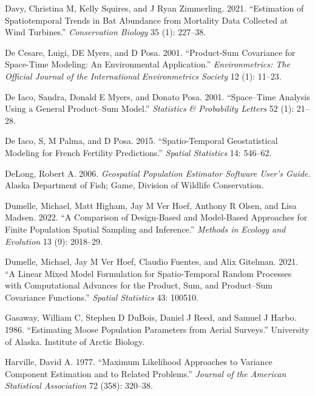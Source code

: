 \documentclass[smallextended]{svjour3}       %
\newlength{\cslhangindent}
\newlength{\cslentryspacingunit} %
\newenvironment{CSLReferences}[2] %
 {%
  \setlength{\parindent}{0pt}
  \ifodd #1
  \let\oldpar\par
  \def\par{\hangindent=\cslhangindent\oldpar}
  \fi
  \setlength{\parskip}{#2\cslentryspacingunit}
 }%
 {}
\begin{document}
\begin{CSLReferences}{1}{0}
\leavevmode{}%
Davy, Christina M, Kelly Squires, and J Ryan Zimmerling. 2021.
{``Estimation of Spatiotemporal Trends in Bat Abundance from Mortality
Data Collected at Wind Turbines.''} \emph{Conservation Biology} 35 (1):
227--38.

\leavevmode{}%
De Cesare, Luigi, DE Myers, and D Posa. 2001. {``Product-Sum Covariance
for Space-Time Modeling: An Environmental Application.''}
\emph{Environmetrics: The Official Journal of the International
Environmetrics Society} 12 (1): 11--23.

\leavevmode{}%
De Iaco, Sandra, Donald E Myers, and Donato Posa. 2001. {``Space--Time
Analysis Using a General Product--Sum Model.''} \emph{Statistics \&
Probability Letters} 52 (1): 21--28.

\leavevmode{}%
De Iaco, S, M Palma, and D Posa. 2015. {``Spatio-Temporal Geostatistical
Modeling for French Fertility Predictions.''} \emph{Spatial Statistics}
14: 546--62.

\leavevmode{}%
DeLong, Robert A. 2006. \emph{Geospatial Population Estimator Software
User's Guide}. Alaska Department of Fish; Game, Division of Wildlife
Conservation.

\leavevmode{}%
Dumelle, Michael, Matt Higham, Jay M Ver Hoef, Anthony R Olsen, and Lisa
Madsen. 2022. {``A Comparison of Design-Based and Model-Based Approaches
for Finite Population Spatial Sampling and Inference.''} \emph{Methods
in Ecology and Evolution} 13 (9): 2018--29.

\leavevmode{}%
Dumelle, Michael, Jay M Ver Hoef, Claudio Fuentes, and Alix Gitelman.
2021. {``A Linear Mixed Model Formulation for Spatio-Temporal Random
Processes with Computational Advances for the Product, Sum, and
Product--Sum Covariance Functions.''} \emph{Spatial Statistics} 43:
100510.

\leavevmode{}%
Gasaway, William C, Stephen D DuBois, Daniel J Reed, and Samuel J Harbo.
1986. {``Estimating Moose Population Parameters from Aerial Surveys.''}
University of Alaska. Institute of Arctic Biology.

\leavevmode{}%
Harville, David A. 1977. {``Maximum Likelihood Approaches to Variance
Component Estimation and to Related Problems.''} \emph{Journal of the
American Statistical Association} 72 (358): 320--38.


\end{CSLReferences}
\end{document}
